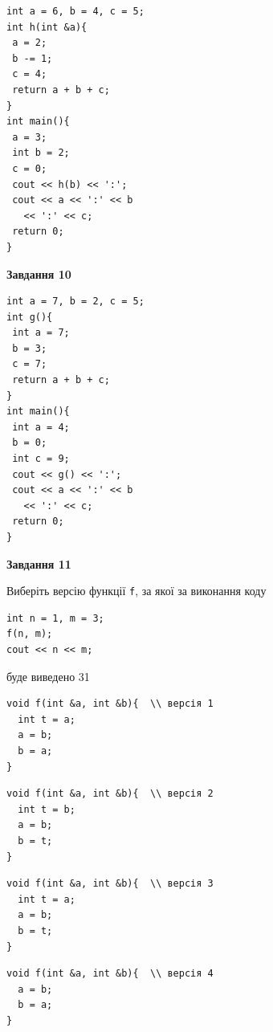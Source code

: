 \documentclass[12pt, ukrainian]{article}
\def\code#1{\Verb!#1!}
\begin{document}
{\begin {large}
\begin{minipage}[t]{7.0cm}
\begin{verbatim}
int a = 6, b = 4, c = 5;
int h(int &a){
 a = 2;
 b -= 1;
 c = 4;
 return a + b + c;
}
int main(){
 a = 3;
 int b = 2;
 c = 0;
 cout << h(b) << ':';
 cout << a << ':' << b 
   << ':' << c;
 return 0;
}
\end{verbatim}



\begin{center}
\textbf{Завдання 10}
\end{center}
\vspace{-8mm}

\begin{verbatim}
int a = 7, b = 2, c = 5;
int g(){
 int a = 7;
 b = 3;
 c = 7;
 return a + b + c;
}
int main(){
 int a = 4;
 b = 0;
 int c = 9;
 cout << g() << ':';
 cout << a << ':' << b 
   << ':' << c;
 return 0;
}
\end{verbatim}

\end{minipage}
\vline \hspace{1mm}
\begin{minipage}[t]{11.0cm}

\begin{center}
\textbf{Завдання 11}
\end{center}
Виберіть версію функції \code{f}, за якої за виконання коду
\begin{verbatim}
int n = 1, m = 3;
f(n, m);
cout << n << m;
\end{verbatim}

буде виведено 31

\begin{verbatim}
void f(int &a, int &b){  \\ версія 1
  int t = a;
  a = b;
  b = a;
}
\end{verbatim}

\vspace{-8mm}\begin{verbatim}
void f(int &a, int &b){  \\ версія 2
  int t = b;
  a = b;
  b = t;
}
\end{verbatim}

\vspace{-8mm}\begin{verbatim}
void f(int &a, int &b){  \\ версія 3
  int t = a;
  a = b;
  b = t;
}
\end{verbatim}

\vspace{-8mm}\begin{verbatim}
void f(int &a, int &b){  \\ версія 4
  a = b;
  b = a;
}
\end{verbatim}




\end{minipage}
\end{large}}
\end{document}
